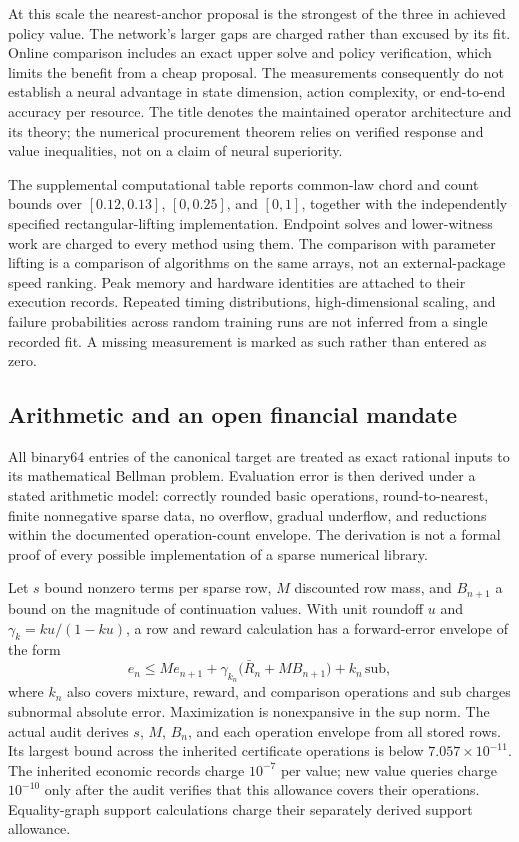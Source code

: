 At this scale the nearest-anchor proposal is the strongest of the three in achieved policy value. The network's larger gaps are charged rather than excused by its fit. Online comparison includes an exact upper solve and policy verification, which limits the benefit from a cheap proposal. The measurements consequently do not establish a neural advantage in state dimension, action complexity, or end-to-end accuracy per resource. The title denotes the maintained operator architecture and its theory; the numerical procurement theorem relies on verified response and value inequalities, not on a claim of neural superiority.

The supplemental computational table reports common-law chord and count bounds over $[0.12,0.13]$, $[0,0.25]$, and $[0,1]$, together with the independently specified rectangular-lifting implementation. Endpoint solves and lower-witness work are charged to every method using them. The comparison with parameter lifting is a comparison of algorithms on the same arrays, not an external-package speed ranking. Peak memory and hardware identities are attached to their execution records. Repeated timing distributions, high-dimensional scaling, and failure probabilities across random training runs are not inferred from a single recorded fit. A missing measurement is marked as such rather than entered as zero.

\subsection{Arithmetic and an open financial mandate}
\label{sec:arithmetic}
All binary64 entries of the canonical target are treated as exact rational inputs to its mathematical Bellman problem. Evaluation error is then derived under a stated arithmetic model: correctly rounded basic operations, round-to-nearest, finite nonnegative sparse data, no overflow, gradual underflow, and reductions within the documented operation-count envelope. The derivation is not a formal proof of every possible implementation of a sparse numerical library.

Let $s$ bound nonzero terms per sparse row, $M$ discounted row mass, and $B_{n+1}$ a bound on the magnitude of continuation values. With unit roundoff $u$ and $\gamma_k=ku/(1-ku)$, a row and reward calculation has a forward-error envelope of the form
\begin{equation}
 e_n\leq M e_{n+1}+\gamma_{k_n}\bigl(\bar R_n+M B_{n+1}\bigr)+k_n\,\mathrm{sub},
 \label{eq:roundoff}
\end{equation}
where $k_n$ also covers mixture, reward, and comparison operations and $\mathrm{sub}$ charges subnormal absolute error. Maximization is nonexpansive in the sup norm. The actual audit derives $s$, $M$, $B_n$, and each operation envelope from all stored rows. Its largest bound across the inherited certificate operations is below $7.057\times10^{-11}$. The inherited economic records charge $10^{-7}$ per value; new value queries charge $10^{-10}$ only after the audit verifies that this allowance covers their operations. Equality-graph support calculations charge their separately derived support allowance.

